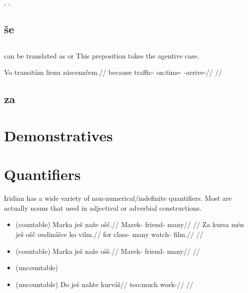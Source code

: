 \pex
\a {}, 
\a {}, 
\xe

\subsection{še}

\subsection{}

 can be translated as  or  This preposition takes the agentive case.

\pex
\begingl
\gla Vo transitám lienu záscenzčem.//
\glb because traffic-\Agt{} on:time-\Ins{} \Neg{}-arrive-//
\glft {}//
\endgl
\xe

\subsection{za}


\section{Demonstratives}\label{dem-adj}

\section{Quantifiers}
Iridian has a wide variety of non-numerical/indefinite quantifiers.  Most are actually nouns that used in adjectival or adverbial constructions.


\begin{itemize}
    \item {}  (countable)
    \ex
    \begingl
    \gla Marka ješ naže ošč.//
    \glb Marek-\Acc{} \Exst{} friend-\Gen{} many//
    \glft {}//
    \endgl
    \xe
    \ex
    \begingl
    \gla Za kursa mén ješ ošč oudinášce ko vilm.//
    \glb for class-\Acc{}  \Exst{} many watch-\Sup{} \Att{} film.//
    \glft {}//
    \endgl
    \xe
    \item {}  (countable)
    \ex
    \begingl
    \gla Marka ješ naže ošš.//
    \glb Marek-\Acc{} \Exst{} friend-\Gen{} many//
    \glft {}//
    \endgl
    \xe
    \item {}  (uncountable)
    \item {}  (uncountable)
    \ex
    \begingl
    \gla Do ješ nahte kurváš//
    \glb {} \Exst{} too:much work-//
    \glft {}//
    \endgl
    \xe

\end{itemize}

